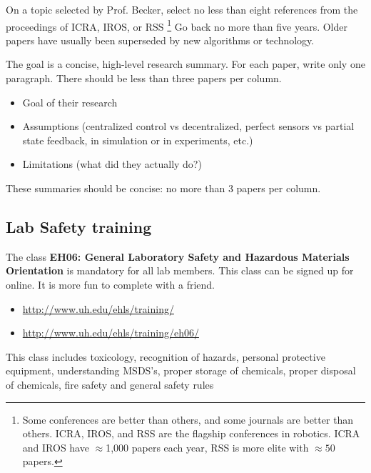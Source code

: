 \documentclass[letterpaper, 10 pt, conference]{ieeeconf}
\begin{document}
On a topic selected by Prof. Becker, select no less than eight references from the proceedings of ICRA, IROS, or RSS \footnote{Some conferences are better than others, and some journals are better than others. ICRA, IROS, and RSS are the flagship conferences in robotics.  ICRA and IROS have $\approx$1,000 papers each year, RSS is more elite with $\approx50$ papers.} Go back no more than five years.  Older papers have usually been superseded by new algorithms or technology.

The goal is a concise, high-level research summary.  For each paper, write only one paragraph.  There should be less than three papers per column.

\begin{itemize}
\item Goal of their research 
\item Assumptions (centralized control vs decentralized, perfect sensors vs partial state feedback, in simulation or in experiments, etc.)
\item Limitations (what did they actually do?)
\end{itemize}

These summaries should be concise: no more than 3 papers per column.


\subsection{Lab Safety training}

The class \textbf{EH06: General Laboratory Safety and Hazardous Materials Orientation} is mandatory for all lab members. This class can be signed up for online. It is more fun to complete with a friend.

\begin{itemize} 
\scriptsize
\item \url{http://www.uh.edu/ehls/training/}
\item \url{http://www.uh.edu/ehls/training/eh06/}
 \end{itemize}

 
 This class includes toxicology, recognition of hazards, personal protective equipment, understanding MSDS's, proper storage of chemicals, proper disposal of chemicals, fire safety and general safety rules



 
 
\end{document}
